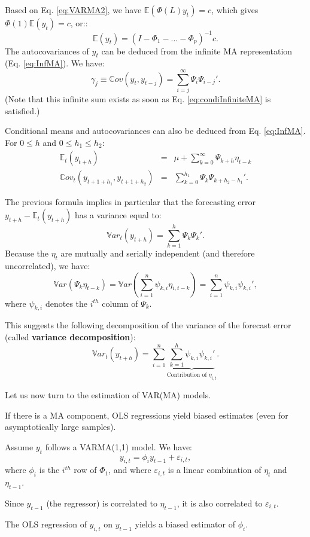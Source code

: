 \documentclass[
  12pt,
]{book}
\theoremstyle{definition}
\theoremstyle{definition}
\theoremstyle{definition}
\theoremstyle{definition}
\theoremstyle{remark}
\begin{document}
Based on Eq. \eqref{eq:VARMA2}, we have \(\mathbb{E}(\Phi(L)y_t)=c\), which gives \(\Phi(1)\mathbb{E}(y_t)=c\), or::
\[
\mathbb{E}(y_t) = (I - \Phi_1 - \dots - \Phi_p)^{-1}c.
\]
The autocovariances of \(y_t\) can be deduced from the infinite MA representation (Eq. \eqref{eq:InfMA}). We have:
\[
\gamma_j \equiv \mathbb{C}ov(y_t,y_{t-j}) = \sum_{i=j}^\infty \Psi_i \Psi_{i-j}'.
\]
(Note that this infinite sum exists as soon as Eq. \eqref{eq:condiInfiniteMA} is satisfied.)

Conditional means and autocovariances can also be deduced from Eq. \eqref{eq:InfMA}. For \(0 \le h\) and \(0 \le h_1 \le h_2\):
\begin{eqnarray*}
\mathbb{E}_t(y_{t+h}) &=& \mu + \sum_{k=0}^\infty \Psi_{k+h} \eta_{t-k} \\
\mathbb{C}ov_t(y_{t+1+h_1},y_{t+1+h_2}) &=& \sum_{k=0}^{h_1} \Psi_{k}\Psi_{k+h_2-h_1}'.
\end{eqnarray*}

The previous formula implies in particular that the forecasting error \(y_{t+h} - \mathbb{E}_t(y_{t+h})\) has a variance equal to:
\[
\mathbb{V}ar_t(y_{t+h}) = \sum_{k=1}^{h} \Psi_{k}\Psi_{k}'.
\]
Because the \(\eta_t\) are mutually and serially independent (and therefore uncorrelated), we have:
\[
\mathbb{V}ar(\Psi_k \eta_{t-k}) = \mathbb{V}ar\left(\sum_{i=1}^n \psi_{k,i} \eta_{i,t-k}\right)  = \sum_{i=1}^n \psi_{k,i}\psi_{k,i}',
\]
where \(\psi_{k,i}\) denotes the \(i^{th}\) column of \(\Psi_k\).

This suggests the following decomposition of the variance of the forecast error (called \textbf{variance decomposition}):
\[
\mathbb{V}ar_t(y_{t+h}) = \sum_{i=1}^n \underbrace{\sum_{k=1}^{h}  \psi_{k,i}\psi_{k,i}'}_{\mbox{Contribution of $\eta_{i,t}$}}.
\]

Let us now turn to the estimation of VAR(MA) models.

If there is a MA component, OLS regressions yield biased estimates (even for asymptotically large samples).

Assume \(y_t\) follows a VARMA(1,1) model. We have:
\[
y_{i,t} = \phi_i y_{t-1} + \varepsilon_{i,t},
\]
where \(\phi_i\) is the \(i^{th}\) row of \(\Phi_1\), and where \(\varepsilon_{i,t}\) is a linear combination of \(\eta_t\) and \(\eta_{t-1}\).

Since \(y_{t-1}\) (the regressor) is correlated to \(\eta_{t-1}\), it is also correlated to \(\varepsilon_{i,t}\).

The OLS regression of \(y_{i,t}\) on \(y_{t-1}\) yields a biased estimator of \(\phi_i\).
\end{document}
